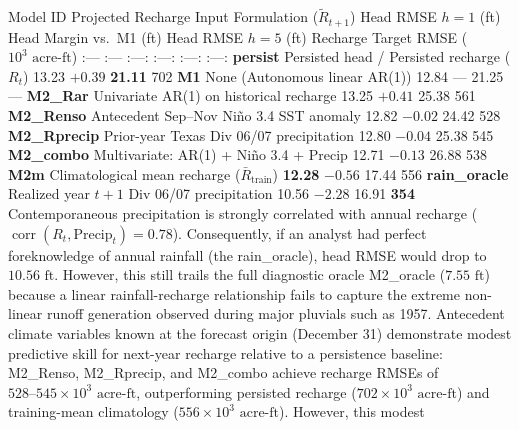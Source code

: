 \documentclass[11pt]{article}
\begin{document}
\textbar{} Model ID \textbar{} Projected Recharge Input Formulation
(\(\tilde{R}_{t+1}\)) \textbar{} Head RMSE \(h=1\) (ft) \textbar{} Head
Margin vs.~M1 (ft) \textbar{} Head RMSE \(h=5\) (ft) \textbar{} Recharge
Target RMSE (\(10^3\text{ acre-ft}\)) \textbar{} \textbar{} :---
\textbar{} :--- \textbar{} :---: \textbar{} :---: \textbar{} :---:
\textbar{} :---: \textbar{} \textbar{} \textbf{persist} \textbar{}
Persisted head / Persisted recharge (\(R_t\)) \textbar{} 13.23
\textbar{} \(+0.39\) \textbar{} \textbf{21.11} \textbar{} 702 \textbar{}
\textbar{} \textbf{M1} \textbar{} None (Autonomous linear AR(1))
\textbar{} 12.84 \textbar{} --- \textbar{} 21.25 \textbar{} ---
\textbar{} \textbar{} \textbf{M2\_Rar} \textbar{} Univariate AR(1) on
historical recharge \textbar{} 13.25 \textbar{} \(+0.41\) \textbar{}
25.38 \textbar{} 561 \textbar{} \textbar{} \textbf{M2\_Renso} \textbar{}
Antecedent Sep--Nov Niño 3.4 SST anomaly \textbar{} 12.82 \textbar{}
\(-0.02\) \textbar{} 24.42 \textbar{} 528 \textbar{} \textbar{}
\textbf{M2\_Rprecip} \textbar{} Prior-year Texas Div 06/07 precipitation
\textbar{} 12.80 \textbar{} \(-0.04\) \textbar{} 25.38 \textbar{} 545
\textbar{} \textbar{} \textbf{M2\_combo} \textbar{} Multivariate: AR(1)
+ Niño 3.4 + Precip \textbar{} 12.71 \textbar{} \(-0.13\) \textbar{}
26.88 \textbar{} 538 \textbar{} \textbar{} \textbf{M2m} \textbar{}
Climatological mean recharge (\(\bar{R}_{\mathrm{train}}\)) \textbar{}
\textbf{12.28} \textbar{} \textbf{\(-0.56\)} \textbar{} 17.44 \textbar{}
556 \textbar{} \textbar{} \textbf{rain\_oracle} \textbar{} Realized year
\(t+1\) Div 06/07 precipitation \textbar{} 10.56 \textbar{} \(-2.28\)
\textbar{} 16.91 \textbar{} \textbf{354} \textbar{} Contemporaneous
precipitation is strongly correlated with annual recharge
(\(\operatorname{corr}(R_t, \text{Precip}_t) = 0.78\)). Consequently, if
an analyst had perfect foreknowledge of annual rainfall (the
rain\_oracle), head RMSE would drop to \(10.56\text{ ft}\). However,
this still trails the full diagnostic oracle M2\_oracle
(\(7.55\text{ ft}\)) because a linear rainfall-recharge relationship
fails to capture the extreme non-linear runoff generation observed
during major pluvials such as 1957. Antecedent climate variables known
at the forecast origin (December 31) demonstrate modest predictive skill
for next-year recharge relative to a persistence baseline: M2\_Renso,
M2\_Rprecip, and M2\_combo achieve recharge RMSEs of
\(528\text{--}545 \times 10^3\text{ acre-ft}\), outperforming persisted
recharge (\(702 \times 10^3\text{ acre-ft}\)) and training-mean
climatology (\(556 \times 10^3\text{ acre-ft}\)). However, this modest
\end{document}
